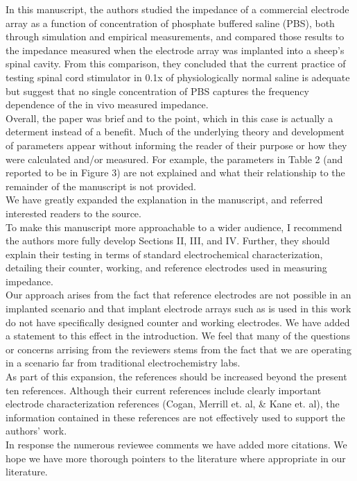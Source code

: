 \documentclass[journal, a4paper]{IEEEtran}
\begin{document}
{\color{blue} In this manuscript, the authors studied the impedance of a commercial electrode array as a function of concentration of phosphate buffered saline (PBS), both through simulation and empirical measurements, and compared those results to the impedance measured when the electrode array was implanted into a sheep's spinal cavity. From this comparison, they concluded that the current practice of testing spinal cord stimulator in 0.1x of physiologically normal saline is adequate but suggest that no single concentration of PBS captures the frequency dependence of the in vivo measured impedance.\\

Overall, the paper was brief and to the point, which in this case is actually a determent instead of a benefit. Much of the underlying theory and development of parameters appear without informing the reader of their purpose or how they were calculated and/or measured.
For example, the parameters in Table 2 (and reported to be in Figure 3) are not explained and what their relationship to the remainder of the manuscript is not provided.\\
{\color{OliveGreen} We have greatly expanded the explanation in the manuscript, and referred interested readers to the source.}\\

To make this manuscript more approachable to a wider audience, I recommend the authors more fully develop Sections II, III, and IV. Further, they should explain their testing in terms of standard electrochemical characterization, detailing their counter, working, and reference electrodes used in measuring impedance.\\
{\color{OliveGreen} Our approach arises from the fact that reference electrodes are not possible in an implanted scenario and that implant electrode arrays such as is used in this work do not have specifically designed counter and working electrodes. We have added a statement to this effect in the introduction. We feel that many of the questions or concerns arrising from the reviewers stems from the fact that we are operating in a scenario far from traditional electrochemistry labs.}\\

As part of this expansion, the references should be increased beyond the present ten references. Although their current references include clearly important electrode characterization references (Cogan, Merrill et. al, \& Kane et. al), the information contained in these references are not effectively used to support the authors’ work.\\
{\color{OliveGreen} In response the numerous reviewee comments we have added more citations. We hope we have more thorough pointers to the literature where appropriate in our literature.}\\

}
\end{document}
